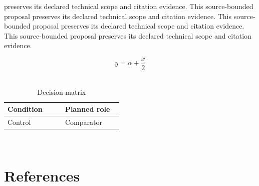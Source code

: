 \documentclass{article}
\begin{document}
preserves its declared technical scope and citation evidence. This source-bounded proposal preserves its declared technical scope and citation evidence. This source-bounded proposal preserves its declared technical scope and citation evidence. This source-bounded proposal preserves its declared technical scope and citation evidence.~\cite{cite_example_1}

\begin{equation}
y = \alpha + \frac{x}{2}
\label{eq:introduction-B2}
\end{equation}~\cite{cite_example_1}

\begin{table}[htbp]
\centering
\small


\caption{Decision matrix}
\label{tab:introduction-B3}
\begin{tabular}{|p{0.45\linewidth}|p{0.45\linewidth}|}
\hline
Condition & Planned role \\\hline
Control & Comparator \\\hline
\end{tabular}
\end{table}~\cite{cite_example_1}
\section*{References}


\end{document}
